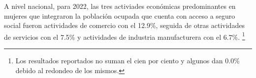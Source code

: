 A nivel nacional, para 2022, las tres activiades económicas predominantes en mujeres que integraron la población ocupada que cuenta con acceso a seguro social fueron actividades de comercio con el 12.9\%, seguida de otras actividades de servicios con el 7.5\% y actividades de industria manufacturera con el 6.7\%. \footnote{Los resultados reportados no suman el cien por ciento y algunos dan 0.0\% debido al redondeo de los mismos.}